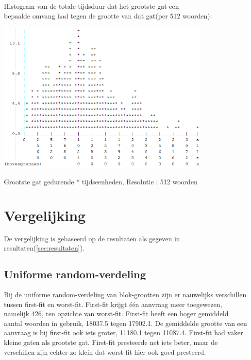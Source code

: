 \documentclass[a4paper]{article}
\begin{document}
			Histogram van de totale tijdsduur dat het grootste gat een\\
			bepaalde omvang had tegen de grootte van dat gat(per 512 woorden):
			\begin{center}
				\includegraphics[width=0.8\textwidth]{wf6.png}
			\end{center}
			Grootste gat gedurende * tijdseenheden, Resolutie : 512 woorden
		\newpage

	\section{Vergelijking}\label{sec:vergelijking}
		De vergelijking is gebaseerd op de resultaten als gegeven in resultaten(\ref{sec:resultaten}).

		\subsection{Uniforme random-verdeling}\label{sec:urv}
			Bij de uniforme random-verdeling van blok-grootten zijn er nauwelijks verschillen tussen first-fit en worst-fit.
			First-fit krijgt \'e\'en aanvraag meer toegewezen, namelijk 426, ten opzichte van worst-fit.
			First-fit heeft een hoger gemiddeld aantal woorden in gebruik, 18037.5 tegen 17902.1.
			De gemiddelde grootte van een aanvraag is bij first-fit ook iets groter, 11180.1 tegen 11087.4.
			First-fit had vaker kleine gaten als grootste gat.
			First-fit presteerde net iets beter, maar de verschillen zijn echter zo klein dat worst-fit hier ook goed presteerd.
\end{document}
